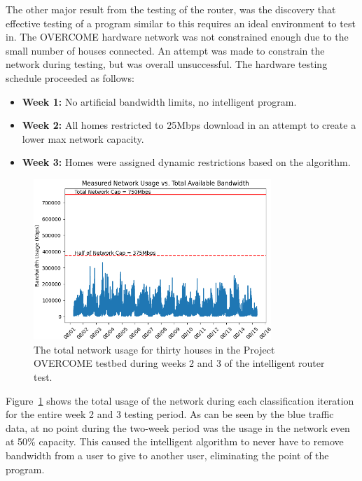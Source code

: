 The other major result from the testing of the router, was the discovery that effective testing of a program similar to this requires an ideal environment to test in.
The OVERCOME hardware network was not constrained enough due to the small number of houses connected.
An attempt was made to constrain the network during testing, but was overall unsuccessful.
The hardware testing schedule proceeded as follows:
\begin{itemize}
    \item \textbf{Week 1:} No artificial bandwidth limits, no intelligent program.
    \item \textbf{Week 2:} All homes restricted to 25Mbps download in an attempt to create a lower max network capacity.
    \item \textbf{Week 3:} Homes were assigned dynamic restrictions based on the algorithm.
\end{itemize}
\begin{figure}[!ht]
    \centering
    \includegraphics[width=0.8\textwidth,keepaspectratio]{Images/Chpt4/Network_Usage.png}
    \caption{The total network usage for thirty houses in the Project OVERCOME testbed during weeks 2 and 3 of the intelligent router test.}
    \label{max_usage}
\end{figure}
Figure~\ref{max_usage} shows the total usage of the network during each classification iteration for the entire week 2 and 3 testing period.
As can be seen by the blue traffic data, at no point during the two-week period was the usage in the network even at 50\% capacity.
This caused the intelligent algorithm to never have to remove bandwidth from a user to give to another user, eliminating the point of the program.

